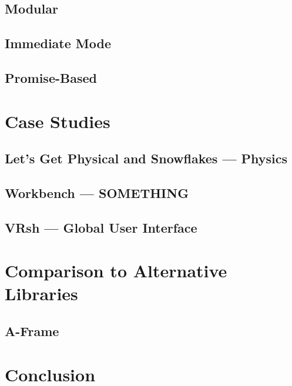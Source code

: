 \documentclass[conference,12pt]{IEEEtran}
\newcommand\name{VRsh}
\begin{document}
\subsection{Modular}
\subsection{Immediate Mode}
\subsection{Promise-Based}

\section{Case Studies}
\subsection{Let's Get Physical and Snowflakes --- Physics}
\subsection{Workbench --- SOMETHING} %
\subsection{{\name} --- Global User Interface}

\section{Comparison to Alternative Libraries}
\subsection{A-Frame}

\section{Conclusion}

\printbibliography
\end{document}
